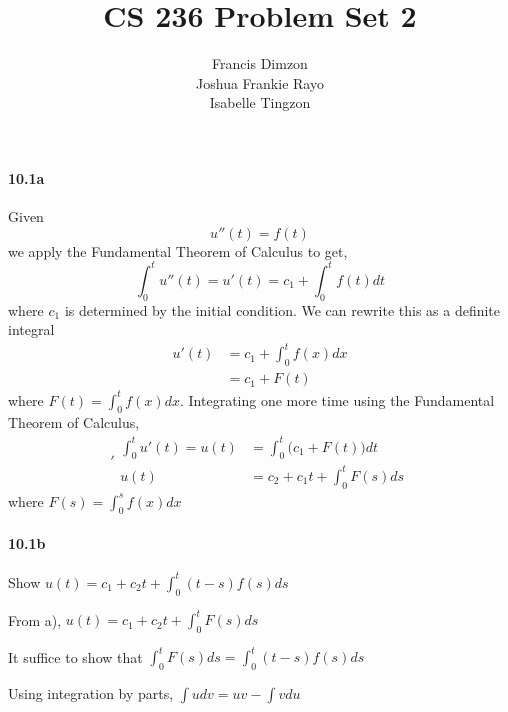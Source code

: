 \documentclass[a4paper, 11pt]{article}
\begin{document}
	\title{\textbf{CS 236 Problem Set 2}}
	\author{Francis Dimzon\\Joshua Frankie Rayo\\Isabelle Tingzon}
	\maketitle
	
	\paragraph{10.1a}
	Given 
	\begin{equation*}
	u ''(t) = f(t) 
	\end{equation*}
	we apply the Fundamental Theorem of Calculus to get,
	\begin{equation*}
	\int_0^t u ''(t) = u'(t) = c_{1} + \int_0^t f(t)dt 
	\end{equation*}
	where $c_1$ is determined by the initial condition. We can rewrite this as a definite integral
	\begin{equation*}
	\begin{split}
	u'(t) &= c_{1} + \int_0^t f(x)dx \\
	&= c_{1} + F(t)
	\end{split}
	\end{equation*}
	where $F(t) = \int_0^t f(x)dx$. Integrating one more time using the Fundamental Theorem of Calculus,
	\begin{equation*}'
	\begin{split}
	\int_0^t u '(t) = u(t) &= \int_0^t \Big( c_{1} + F(t) \Big)dt \\
	u(t) &= c_{2} + c_{1}t + \int_0^t F(s) ds 
	\end{split}
	\end{equation*}
	where $F(s) = \int_0^s f(x)dx$ 
	
	\paragraph{10.1b}
	
	Show $u(t)=c_{1}+c_{2}t+\int_{0}^{t}(t-s)f(s)ds$
	
	From a), $u(t)=c_{1}+c_{2}t+\int_{0}^{t}F(s)ds$
	
	It suffice to show that $\int_{0}^{t}F(s)ds=\int_{0}^{t}(t-s)f(s)ds$
	
	Using integration by parts, $\int udv=uv-\int vdu$
	
\end{document}
